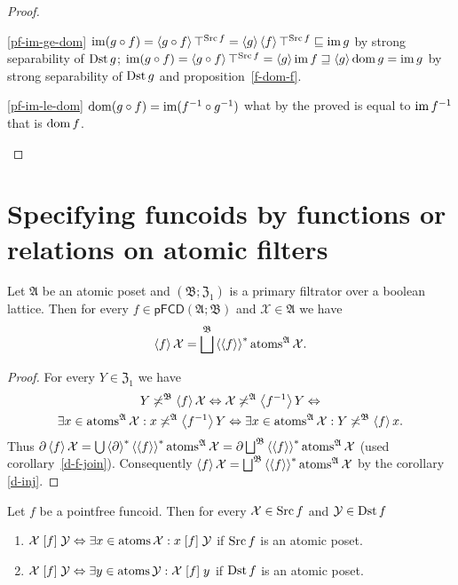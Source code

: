 \begin{proof}
~
\begin{widedisorder}
\item [{\ref{pf-im-ge-dom}}] $\operatorname{im}(g\circ f)=\left\langle g\circ f\right\rangle\top^{\operatorname{Src} f}=\left\langle g\right\rangle\left\langle f\right\rangle\top^{\operatorname{Src} f}\sqsubseteq\operatorname{im} g$
by strong separability of $\operatorname{Dst} g$;
$\operatorname{im}(g\circ f)=\left\langle g\circ f\right\rangle\top^{\operatorname{Src} f}=\left\langle g\right\rangle\operatorname{im} f\sqsupseteq\left\langle g\right\rangle\operatorname{dom} g=\operatorname{im} g$ by strong separability of $\operatorname{Dst} g$
and proposition~\ref{f-dom-f}.
\item [{\ref{pf-im-le-dom}}] $\operatorname{dom}(g\circ f)=\operatorname{im}(f^{-1}\circ g^{-1})$
what by the proved is equal to $\operatorname{im} f^{-1}$ that is $\operatorname{dom} f$.
\end{widedisorder}
\end{proof}

\section{Specifying funcoids by functions or relations on atomic filters}
\begin{thm}
\label{spfn-atoms}Let $\mathfrak{A}$ be an atomic poset and $(\mathfrak{B};\mathfrak{Z}_{1})$
is a primary filtrator over a boolean lattice. Then for every $f\in\mathsf{pFCD}(\mathfrak{A};\mathfrak{B})$
and $\mathcal{X}\in\mathfrak{A}$ we have
\[
\supfun f\mathcal{X}=\bigsqcup^{\mathfrak{B}}\rsupfun{\supfun f}\atoms^{\mathfrak{A}}\mathcal{X}.
\]
\end{thm}
\begin{proof}
For every $Y\in\mathfrak{Z}_{1}$ we have
\begin{multline*}
Y\not\asymp^{\mathfrak{B}}\left\langle f\right\rangle\mathcal{X}\Leftrightarrow\mathcal{X}\not\asymp^{\mathfrak{A}}\left\langle f^{-1}\right\rangle Y\Leftrightarrow\\
\exists x\in\operatorname{atoms}^{\mathfrak{A}}\mathcal{X}:x\not\asymp^{\mathfrak{A}}\left\langle f^{-1}\right\rangle Y\Leftrightarrow\exists x\in\operatorname{atoms}^{\mathfrak{A}}\mathcal{X}:Y\not\asymp^{\mathfrak{B}}\left\langle f\right\rangle x.
\end{multline*}
Thus $\corestar\supfun f\mathcal{X}=\bigcup\rsupfun{\corestar}\rsupfun{\supfun f}\atoms^{\mathfrak{A}}\mathcal{X}=\corestar\bigsqcup^{\mathfrak{B}}\rsupfun{\supfun f}\atoms^{\mathfrak{A}}\mathcal{X}$
(used corollary~\ref{d-f-join}). Consequently $\supfun f\mathcal{X}=\bigsqcup^{\mathfrak{B}}\rsupfun{\supfun f}\atoms^{\mathfrak{A}}\mathcal{X}$
by the corollary \ref{d-inj}.\end{proof}
\begin{prop}
Let $f$ be a pointfree funcoid. Then for every $\mathcal{X}\in\operatorname{Src} f$
and $\mathcal{Y}\in\operatorname{Dst} f$
\begin{enumerate}
\item $\mathcal{X}\mathrel{\left[f\right]}\mathcal{Y}\Leftrightarrow\exists x\in\operatorname{atoms}\mathcal{X}:x\mathrel{\left[f\right]}\mathcal{Y}$
if $\operatorname{Src} f$ is an atomic poset.
\item $\mathcal{X}\mathrel{\left[f\right]}\mathcal{Y}\Leftrightarrow\exists y\in\operatorname{atoms}\mathcal{Y}:\mathcal{X}\mathrel{\left[f\right]}y$
if $\operatorname{Dst} f$ is an atomic poset.
\end{enumerate}
\end{prop}
